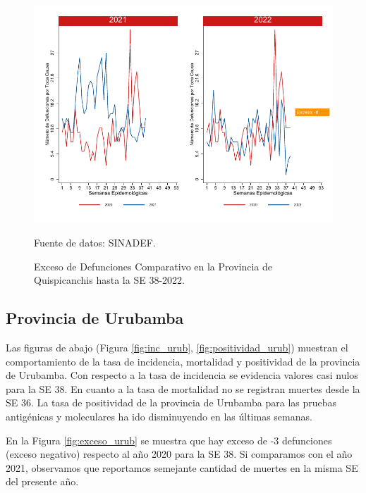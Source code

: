 \documentclass[12pt,a4paper,openany]{book}
\begin{document}
	\begin{figure}[h]
		\caption{Exceso de Defunciones Comparativo en la Provincia de Quispicanchis hasta la SE 38-2022.}\label{fig:exceso_quisp}
		\begin{center}
			\includegraphics[width=0.7\linewidth]{../figuras/exceso_12.pdf}
		\end{center}
		{\footnotesize {Fuente de datos: SINADEF.}}
	\end{figure}
	
	\clearpage
	
	\subsection*{Provincia de Urubamba}
	\noindent Las figuras de abajo (Figura \ref{fig:inc_urub}, \ref{fig:positividad_urub}) muestran el comportamiento de la tasa de incidencia, mortalidad y positividad de la provincia de Urubamba. Con respecto a la tasa de incidencia se evidencia valores casi nulos para la SE 38. En cuanto a la tasa de mortalidad no se registran muertes desde la SE 36. La tasa de positividad de la provincia de Urubamba para las pruebas antigénicas y moleculares ha ido disminuyendo en las últimas semanas.
	
	En la Figura \ref{fig:exceso_urub} se muestra que hay exceso de -3 defunciones (exceso negativo) respecto al año 2020 para la SE 38. Si comparamos con el año 2021, observamos que reportamos semejante cantidad de muertes en la misma SE del presente año.
	
\end{document}
